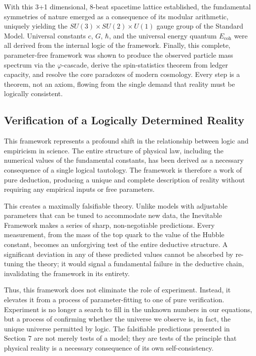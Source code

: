 \documentclass[11pt,a4paper]{article}
\begin{document}
With this 3+1 dimensional, 8-beat spacetime lattice established, the fundamental symmetries of nature emerged as a consequence of its modular arithmetic, uniquely yielding the \(SU(3) \times SU(2) \times U(1)\) gauge group of the Standard Model. Universal constants \(c\), \(G\), \(\hbar\), and the universal energy quantum \(E_{\text{coh}}\) were all derived from the internal logic of the framework. Finally, this complete, parameter-free framework was shown to produce the observed particle mass spectrum via the \(\varphi\)-cascade, derive the spin-statistics theorem from ledger capacity, and resolve the core paradoxes of modern cosmology. Every step is a theorem, not an axiom, flowing from the single demand that reality must be logically consistent.

\subsection{Verification of a Logically Determined Reality}
This framework represents a profound shift in the relationship between logic and empiricism in science. The entire structure of physical law, including the numerical values of the fundamental constants, has been derived as a necessary consequence of a single logical tautology. The framework is therefore a work of pure deduction, producing a unique and complete description of reality without requiring any empirical inputs or free parameters.

This creates a maximally falsifiable theory. Unlike models with adjustable parameters that can be tuned to accommodate new data, the Inevitable Framework makes a series of sharp, non-negotiable predictions. Every measurement, from the mass of the top quark to the value of the Hubble constant, becomes an unforgiving test of the entire deductive structure. A significant deviation in any of these predicted values cannot be absorbed by re-tuning the theory; it would signal a fundamental failure in the deductive chain, invalidating the framework in its entirety.

Thus, this framework does not eliminate the role of experiment. Instead, it elevates it from a process of parameter-fitting to one of pure verification. Experiment is no longer a search to fill in the unknown numbers in our equations, but a process of confirming whether the universe we observe is, in fact, the unique universe permitted by logic. The falsifiable predictions presented in Section 7 are not merely tests of a model; they are tests of the principle that physical reality is a necessary consequence of its own self-consistency.
\end{document}
